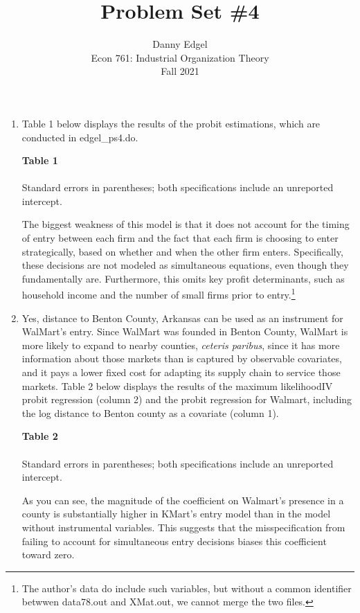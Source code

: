 \documentclass{article}
\begin{document}
\title{	Problem Set \#4 }
\author{ 	Danny Edgel 					        	      \\ 
			Econ 761: Industrial Organization Theory	\\
			Fall 2021						                      \\
		}
\maketitle\thispagestyle{empty}



\begin{enumerate}
    \item Table 1 below displays the results of the probit estimations, which are conducted in edgel\_ps4.do.
        \begin{center}
            \textbf{Table 1} \\ \medskip
             \\ \smallskip
            \footnotesize{Standard errors in parentheses; both specifications include an unreported intercept.}
        \end{center}
    The biggest weakness of this model is that it does not account for the timing of entry between each firm and the fact that each firm is choosing to enter strategically, based on whether and when the other firm enters. Specifically, these decisions are not modeled as simultaneous equations, even though they fundamentally are. Furthermore, this omits key profit determinants, such as household income and the number of small firms prior to entry.\footnote{The author's data do include such variables, but without a common identifier betwwen data78.out and XMat.out, we cannot merge the two files.}

    \item Yes, distance to Benton County, Arkansas can be used as an instrument for WalMart's entry. Since WalMart was founded in Benton County, WalMart is more likely to expand to nearby counties, \textit{ceteris paribus}, since it has more information about those markets than is captured by observable covariates, and it pays a lower fixed cost for adapting its supply chain to service those markets. Table 2 below displays the results of the maximum likelihoodIV probit regression (column 2) and the probit regression for Walmart, including the log distance to Benton county as a covariate (column 1).
    \begin{center}
        \textbf{Table 2} \\ \medskip
         \\ \smallskip
        \footnotesize{Standard errors in parentheses; both specifications include an unreported intercept.}
    \end{center}
    As you can see, the magnitude of the coefficient on Walmart's presence in a county is substantially higher in KMart's entry model than in the model without instrumental variables. This suggests that the misspecification from failing to account for simultaneous entry decisions biases this coefficient toward zero.
\end{enumerate}
\end{document}
